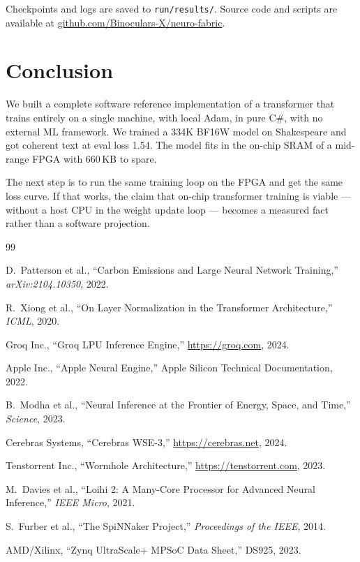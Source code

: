 \documentclass[11pt]{article}
\newcommand{\repourl}{https://github.com/Binoculars-X/neuro-fabric}
\newcommand{\repourltext}{github.com/Binoculars-X/neuro-fabric}
\begin{document}
Checkpoints and logs are saved to \texttt{run/results/}.
Source code and scripts are available at \href{\repourl}{\repourltext}.

\section{Conclusion}

We built a complete software reference implementation of a transformer that trains
entirely on a single machine, with local Adam, in pure C\#, with no external ML
framework. We trained a 334K BF16W model on Shakespeare and got coherent text at
eval loss 1.54. The model fits in the on-chip SRAM of a mid-range FPGA with 660\,KB
to spare.

The next step is to run the same training loop on the FPGA and get the same loss curve.
If that works, the claim that on-chip transformer training is viable --- without a host
CPU in the weight update loop --- becomes a measured fact rather than a software projection.

\begin{thebibliography}{99}

D.~Patterson et al., ``Carbon Emissions and Large Neural Network Training,'' \emph{arXiv:2104.10350}, 2022.

R.~Xiong et al., ``On Layer Normalization in the Transformer Architecture,''
\emph{ICML}, 2020.

Groq Inc., ``Groq LPU Inference Engine,'' \url{https://groq.com}, 2024.

Apple Inc., ``Apple Neural Engine,'' Apple Silicon Technical Documentation, 2022.

B.~Modha et al., ``Neural Inference at the Frontier of Energy, Space, and Time,''
\emph{Science}, 2023.

Cerebras Systems, ``Cerebras WSE-3,'' \url{https://cerebras.net}, 2024.

Tenstorrent Inc., ``Wormhole Architecture,'' \url{https://tenstorrent.com}, 2023.

M.~Davies et al., ``Loihi 2: A Many-Core Processor for Advanced Neural Inference,''
\emph{IEEE Micro}, 2021.

S.~Furber et al., ``The SpiNNaker Project,'' \emph{Proceedings of the IEEE}, 2014.

AMD/Xilinx, ``Zynq UltraScale+ MPSoC Data Sheet,'' DS925, 2023.

\end{thebibliography}
\end{document}
